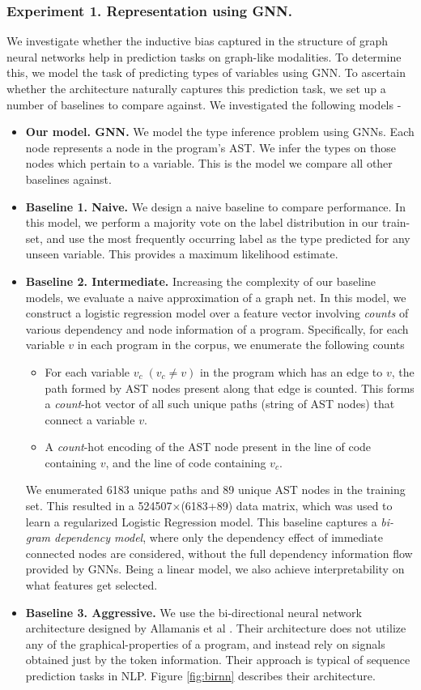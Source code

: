 \subsubsection{Experiment 1. Representation using GNN.}
We investigate whether the inductive bias captured in the structure of graph neural networks help in prediction tasks on graph-like modalities. To determine this, we model the task of predicting types of variables using GNN. To ascertain whether the architecture naturally captures this prediction task, we set up a number of baselines to compare against. We investigated the following models -
\begin{itemize}[noitemsep,topsep=0pt]
	\item \textbf{Our model. GNN.} We model the type inference problem using GNNs. Each node represents a node in the program's AST. We infer the types on those nodes which pertain to a variable. This is the model we compare all other baselines against.
	\item \textbf{Baseline 1. Naive.} We design a naive baseline to compare performance. In this model, we perform a majority vote on the label distribution in our train-set, and use the most frequently occurring label as the type predicted for any unseen variable. This provides a maximum likelihood estimate.
	\item \textbf{Baseline 2. Intermediate.} Increasing the complexity of our baseline models, we evaluate a naive approximation of a graph net. In this model, we construct a logistic regression model over a feature vector involving \textit{counts} of various dependency and node information of a program. Specifically, for each variable $v$ in each program in the corpus, we enumerate the following counts
	\begin{itemize}[noitemsep,topsep=0pt]
		\item For each variable $v_c\;(v_c\not=v)$ in the program which has an edge to $v$, the path formed by AST nodes present along that edge is counted. This forms a \textit{count}-hot vector of all such unique paths (string of AST nodes) that connect a variable $v$.
		\item A \textit{count}-hot encoding of the AST node present in the line of code containing $v$, and the line of code containing $v_c$.
	\end{itemize}
	We enumerated 6183 unique paths and 89 unique AST nodes in the training set. This resulted in a 524507$\times$(6183+89) data matrix, which was used to learn a regularized Logistic Regression model. This baseline captures a \textit{bi-gram dependency model}, where only the dependency effect of immediate connected nodes are considered, without the full dependency information flow provided by GNNs. Being a linear model, we also achieve interpretability on what features get selected.
	\item \textbf{Baseline 3. Aggressive.} We use the bi-directional neural network architecture designed by Allamanis et al \cite{hellendoorn2018deep}. Their architecture does not utilize any of the graphical-properties of a program, and instead rely on signals obtained just by the token information. Their approach is typical of sequence prediction tasks in NLP. Figure \ref{fig:birnn} describes their architecture.
\end{itemize}
